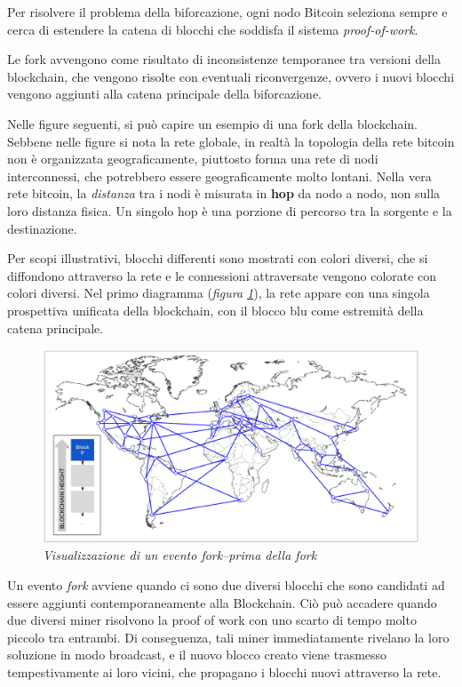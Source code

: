 Per risolvere il problema della biforcazione, ogni nodo Bitcoin seleziona sempre e cerca di estendere la catena di blocchi che soddisfa il sistema \textit{proof-of-work}.

Le fork avvengono come risultato di inconsistenze temporanee tra versioni della blockchain,
che vengono risolte con eventuali riconvergenze, ovvero i nuovi blocchi vengono aggiunti alla catena principale della biforcazione.

Nelle figure seguenti, si può capire un esempio di una fork della blockchain. Sebbene nelle figure si nota la rete globale, in realtà la topologia della rete bitcoin non è organizzata geograficamente, piuttosto forma una rete di nodi interconnessi, che potrebbero essere geograficamente molto lontani. Nella vera rete bitcoin, la \textit{distanza} tra i nodi è misurata in \textbf{hop} da nodo a nodo, non sulla loro distanza fisica. Un singolo hop è una porzione di percorso tra la sorgente e la destinazione. 

Per scopi illustrativi, blocchi differenti sono mostrati con colori diversi, che si diffondono attraverso la rete e le connessioni attraversate vengono colorate con colori diversi.
Nel primo diagramma (\textit{figura \ref{fig:fork1}}), la rete appare con una singola prospettiva unificata della blockchain, con il blocco blu come estremità della catena principale.
\begin{figure}[h]
	\centering
	\includegraphics[width=0.85 \linewidth]{figure/fork1}
	\caption{\textit{Visualizzazione di un evento fork--prima della fork} \label{fig:fork1}}
\end{figure}

Un evento \textit{fork} avviene quando ci sono due diversi blocchi che sono candidati ad essere aggiunti contemporaneamente alla Blockchain. Ciò può accadere quando due diversi miner risolvono la proof of work con uno scarto di tempo molto piccolo tra entrambi. Di conseguenza, tali miner immediatamente rivelano la loro soluzione in modo broadcast, e il nuovo blocco creato viene trasmesso tempestivamente ai loro vicini, che propagano i blocchi nuovi attraverso la rete. 

